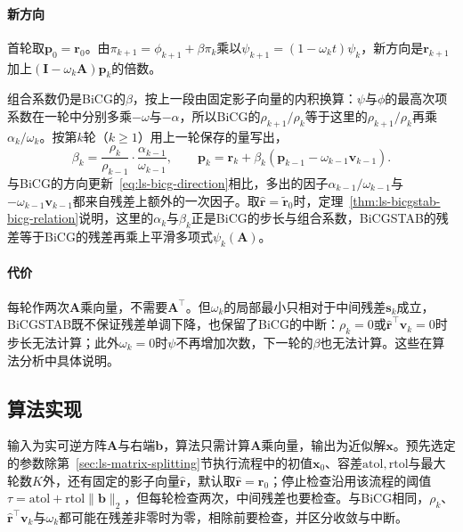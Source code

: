 \paragraph{新方向}
首轮取$\bm p_0=\bm r_0$。由$\pi_{k+1}=\phi_{k+1}+\beta\pi_k$乘以$\psi_{k+1}=(1-\omega_kt)\psi_k$，新方向是$\bm r_{k+1}$加上$(\bm I-\omega_k\bm A)\bm p_k$的倍数。

组合系数仍是BiCG的$\beta$，按上一段由固定影子向量的内积换算：$\psi$与$\phi$的最高次项系数在一轮中分别多乘$-\omega$与$-\alpha$，所以BiCG的$\rho_{k+1}/\rho_k$等于这里的$\rho_{k+1}/\rho_k$再乘$\alpha_k/\omega_k$。按第$k$轮（$k\ge1$）用上一轮保存的量写出，
\begin{equation}
 \beta_k=\frac{\rho_k}{\rho_{k-1}}\cdot\frac{\alpha_{k-1}}{\omega_{k-1}},\qquad
 \bm p_k=\bm r_k+\beta_k(\bm p_{k-1}-\omega_{k-1}\bm v_{k-1}).
 \label{eq:ls-bicgstab-direction}
\end{equation}
与BiCG的方向更新~\eqref{eq:ls-bicg-direction}相比，多出的因子$\alpha_{k-1}/\omega_{k-1}$与$-\omega_{k-1}\bm v_{k-1}$都来自残差上额外的一次因子。取$\widehat{\bm r}=\widetilde{\bm r}_0$时，定理~\ref{thm:ls-bicgstab-bicg-relation}说明，这里的$\alpha_k$与$\beta_k$正是BiCG的步长与组合系数，BiCGSTAB的残差等于BiCG的残差再乘上平滑多项式$\psi_k(\bm A)$。

\paragraph{代价}
每轮作两次$\bm A$乘向量，不需要$\bm A^\top$。但$\omega_k$的局部最小只相对于中间残差$\bm s_k$成立，BiCGSTAB既不保证残差单调下降，也保留了BiCG的中断：$\rho_k=0$或$\widehat{\bm r}^\top\bm v_k=0$时步长无法计算；此外$\omega_k=0$时$\psi$不再增加次数，下一轮的$\beta$也无法计算。这些在算法分析中具体说明。

\subsection{算法实现}

输入为实可逆方阵$\bm A$与右端$\bm b$，算法只需计算$\bm A$乘向量，输出为近似解$\bm x$。预先选定的参数除第~\ref{sec:ls-matrix-splitting}节执行流程中的初值$\bm x_0$、容差$\mathrm{atol},\mathrm{rtol}$与最大轮数$K$外，还有固定的影子向量$\widehat{\bm r}$，默认取$\widehat{\bm r}=\bm r_0$；停止检查沿用该流程的阈值$\tau=\mathrm{atol}+\mathrm{rtol}\lVert\bm b\rVert_2$，但每轮检查两次，中间残差也要检查。与BiCG相同，$\rho_k$、$\widehat{\bm r}^\top\bm v_k$与$\omega_k$都可能在残差非零时为零，相除前要检查，并区分收敛与中断。

